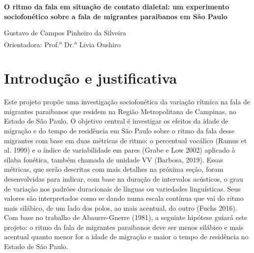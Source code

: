 \documentclass[12pt,a4paper,oneside]{article}
\begin{document}
 

    { %


	\begin{center} 
	    \Large\bfseries O ritmo da fala em situação de contato dialetal: um experimento
	    sociofonético sobre a fala de migrantes paraibanos em São Paulo 
	\end{center}

	\vspace{0.35em}


	\begin{flushright} 
	    Gustavo de Campos Pinheiro da Silveira \\ 
	    \vspace{5pt}
	    Orientadora: Prof.\textsuperscript{a} Dr.\textsuperscript{a} Livia Oushiro
	\end{flushright}

	\vspace{0.35em}





  } 


    \section{Introdução e justificativa}
    
    Este projeto propõe uma investigação sociofonética da variação rítmica na fala de migrantes paraibanos que residem na Região Metropolitana de Campinas, no Estado de São Paulo. O objetivo central é investigar os efeitos da idade de migração e do tempo de residência em São Paulo sobre o ritmo da fala desse migrantes com base em duas métricas de ritmo: o percentual vocálico (Ramus et al. 1999) e o índice de variabilidade em pares (Grabe e Low 2002) aplicado à sílaba fonética, também chamada de unidade VV (Barbosa, 2019). Essas métricas, que serão descritas com mais detalhes na próxima seção, foram desenvolvidas para indicar, com base na duração de intervalos acústicos, o grau de variação nos padrões duracionais de línguas ou variedades linguísticas. Seus valores são interpretados como se dando numa escala contínua que vai do ritmo mais silábico, de um lado dos polos, ao mais acentual, do outro (Fuchs 2016). Com base no trabalho de Abaurre-Gnerre (1981), a seguinte hipótese guiará este projeto: o ritmo da fala de migrantes paraibanos deve ser menos silábico e mais acentual quanto menor for a idade de migração e maior o tempo de residência no Estado de São Paulo.
    
\end{document}
